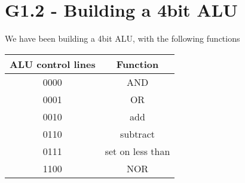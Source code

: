 \documentclass[11pt,a4paper]{article}
\begin{document}

\section*{G1.2 - Building a 4bit ALU}
We have been building a 4bit ALU, with the following functions

\begin{table}[htb!]
\begin{tabular}{| c | c |}
    \centering
    ALU control lines & Function \\ \hline
    0000 & AND \\
    0001 & OR \\
    0010 & add \\
    0110 & subtract \\
    0111 & set on less than \\
    1100 & NOR \\

\end{tabular}
\end{table}
\end{document}
